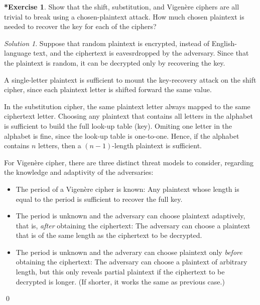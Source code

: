 \documentclass[titlepage,reqno]{amsart}
\theoremstyle{definition}
\newtheorem{exercise*}[exercise]{*Exercise}
\theoremstyle{remark}
\newtheorem*{solution}{Solution}
\begin{document}
\begin{exercise*}
    Show that the shift, substitution, and Vigen\`ere ciphers are all trivial to break using a chosen-plaintext attack.
    How much chosen plaintext is needed to recover the key for each of the ciphers?

    \begin{solution}
        Suppose that random plaintext is encrypted, instead of English-language text, and the ciphertext is 
        eavesrdropped by the adversary.
        Since that the plaintext is random, it can be decrypted only by recovering the key.

        A single-letter plaintext is sufficient to mount the key-recovery attack on the shift cipher,
        since each plaintext letter is shifted forward the same value.

        In the substitution cipher, the same plaintext letter always mapped to the same ciphertext letter.
        Choosing any plaintext that contains all letters in the alphabet is sufficient 
        to build the full look-up table (key).
        Omiting one letter in the alphabet is fine, since the look-up table is one-to-one.
        Hence, if the alphabet contains $n$ letters, then a $(n-1)$-length plaintext is sufficient.

        For Vigen\`ere cipher, there are three distinct threat models to consider, regarding the
        knowledge and adaptivity of the adversaries:
        \begin{itemize}[leftmargin=*]
            \item  The period of a Vigen\`ere cipher is known: 
                Any plaintext whose length is equal to the period is sufficient to recover the full key.
            \item The period is unknown and the adversary can choose plaintext adaptively, that is, 
                \emph{after} obtaining the ciphertext:
                The adversary can choose a plaintext that is of the same length as the ciphertext to be decrypted.
            \item The period is unknown and the adverary can choose plaintext only \emph{before} obtaining the ciphertext:
                The adversary can choose a plaintext of arbitrary length, but this only reveals partial plaintext if 
                the ciphertext to be decrypted is longer. (If shorter, it works the same as previous case.) 
        \end{itemize}
        \qed
    \end{solution}
\end{exercise*}
\end{document}
